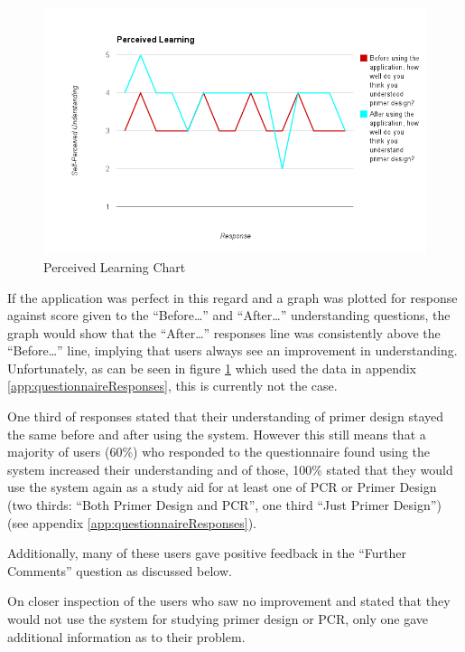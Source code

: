 \begin{figure}[!t]
  \begin{center}
    \includegraphics[width=\textwidth]{./images/perceivedLearning.png}
    \caption{Perceived Learning Chart}
    \label{fig:feedbackAnalysis:perceivedLearning}
  \end{center}
\end{figure}

If the application was perfect in this regard and a graph was plotted
for response against score given to the ``Before\ldots'' and ``After\ldots''
understanding questions, the graph would show that the ``After\ldots''
responses line was consistently above the ``Before\ldots'' line, implying
that users always see an improvement in understanding.
Unfortunately, as can be seen in figure
\ref{fig:feedbackAnalysis:perceivedLearning} which used the data in
appendix \ref{app:questionnaireResponses}, this is currently not the
case.

One third of responses stated that their understanding of primer
design stayed the same before and after using the system.
However this still means that a majority of users (60\%) who responded
to the questionnaire found using the system increased their
understanding and of those, 100\% stated that they would use the
system again as a study aid for at least one of PCR or Primer Design
(two thirds: ``Both Primer Design and PCR'', one third ``Just Primer
Design'') (see appendix \ref{app:questionnaireResponses}).

Additionally, many of these users gave positive feedback in the
``Further Comments'' question as discussed below.

On closer inspection of the users who saw no improvement and stated
that they would not use the system for studying primer design or PCR,
only one gave additional information as to their problem.

